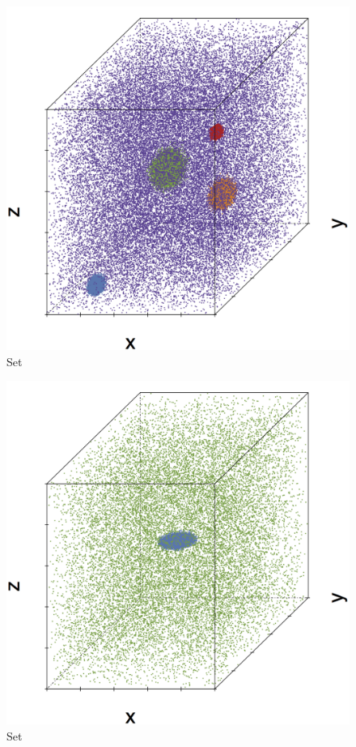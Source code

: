 \begin{subfigure}{0.18\textwidth}
	\centering
	\includegraphics[width=\textwidth]{3/img/datasetplot_ferdosi_3_120000.png}
	\caption{Set \ferdosiThree}
	\label{fig:3:simulated:datasets:ferdosi3}
\end{subfigure}	
\begin{subfigure}{0.18\textwidth}
	\centering
	\includegraphics[width=\textwidth]{3/img/datasetplot_baakman_4_60000.png}
	\caption{Set \baakmanFour}
	\label{fig:3:simulated:datasets:baakman4}
\end{subfigure}	
